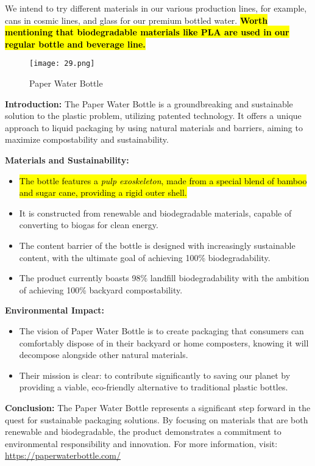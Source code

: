 \documentclass{article}
\begin{document}
\begin{itemize}
\begin{table}[H]
\begin{tabular}{|p{3cm}|p{12cm}|}
\hline
\end{tabular}
\end{table}
We intend to try different materials in our various production lines, for example, cans in cosmic lines, and glass for our premium bottled water. \textbf{\hl{Worth mentioning that biodegradable materials like PLA are used in our regular bottle and beverage line.}}\par
\begin{figure}[H]
\centering
\texttt{[image: 29.png]}
\caption{Paper Water Bottle}
\label{fig:image1}
\end{figure}
\textbf{Introduction:} The Paper Water Bottle is a groundbreaking and sustainable solution to the plastic problem, utilizing patented technology. It offers a unique approach to liquid packaging by using natural materials and barriers, aiming to maximize compostability and sustainability.

\textbf{Materials and Sustainability:} 
\begin{itemize}
    \item \hl{The bottle features a \textit{pulp exoskeleton}, made from a special blend of bamboo and sugar cane, providing a rigid outer shell.}
    \item It is constructed from renewable and biodegradable materials, capable of converting to biogas for clean energy.
    \item The content barrier of the bottle is designed with increasingly sustainable content, with the ultimate goal of achieving 100\% biodegradability.
    \item The product currently boasts 98\% landfill biodegradability with the ambition of achieving 100\% backyard compostability.
\end{itemize}

\textbf{Environmental Impact:} 
\begin{itemize}
    \item The vision of Paper Water Bottle is to create packaging that consumers can comfortably dispose of in their backyard or home composters, knowing it will decompose alongside other natural materials.
    \item Their mission is clear: to contribute significantly to saving our planet by providing a viable, eco-friendly alternative to traditional plastic bottles.
\end{itemize}

\textbf{Conclusion:} 
The Paper Water Bottle represents a significant step forward in the quest for sustainable packaging solutions. By focusing on materials that are both renewable and biodegradable, the product demonstrates a commitment to environmental responsibility and innovation.
For more information, visit: \url{https://paperwaterbottle.com/}\par



\end{itemize}
\end{document}
